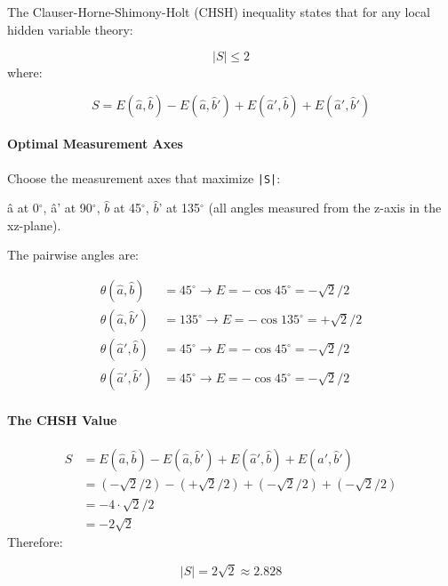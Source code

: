 \documentclass[aps,prd,preprint,superscriptaddress,longbibliography,floatfix]{revtex4-2}
\theoremstyle{remark}
\begin{document}
The Clauser-Horne-Shimony-Holt (CHSH) inequality states that for any local hidden variable theory:


\begin{equation}
    |S| \leq 2
\end{equation}
where:


\begin{equation}
    S = E(\hat{a}, \hat{b}) - E(\hat{a}, \hat{b}') + E(\hat{a}', \hat{b}) + E(\hat{a}', \hat{b}')
\end{equation}

\paragraph{Optimal Measurement Axes}

Choose the measurement axes that maximize \texttt{|S|}:


â at 0$^{\circ}$,  â' at 90$^{\circ}$,  $\hat{b}$ at 45$^{\circ}$,  $\hat{b}$' at 135$^{\circ}$
(all angles measured from the z-axis in the xz-plane).

The pairwise angles are:


\begin{align}
    \theta(\hat{a}, \hat{b}) &= 45^{\circ}    \to E = -\cos 45^{\circ}  = -\sqrt{2}/2 \\
    \theta(\hat{a}, \hat{b}') &= 135^{\circ}   \to E = -\cos 135^{\circ} = +\sqrt{2}/2 \\
    \theta(\hat{a}', \hat{b}) &= 45^{\circ}    \to E = -\cos 45^{\circ}  = -\sqrt{2}/2 \\
    \theta(\hat{a}', \hat{b}') &= 45^{\circ}    \to E = -\cos 45^{\circ}  = -\sqrt{2}/2
\end{align}

\paragraph{The CHSH Value}


\begin{align}
    S &= E(\hat{a}, \hat{b}) - E(\hat{a}, \hat{b}') + E(\hat{a}', \hat{b}) + E(\hat{a}', \hat{b}') \\
    & = (-\sqrt{2}/2) - (+\sqrt{2}/2) + (-\sqrt{2}/2) + (-\sqrt{2}/2) \\
    & = -4 \cdot \sqrt{2}/2 \\
    & = -2\sqrt{2}
\end{align}
Therefore:


\begin{equation}
    |S| = 2\sqrt{2} \approx 2.828
\end{equation}
\end{document}
